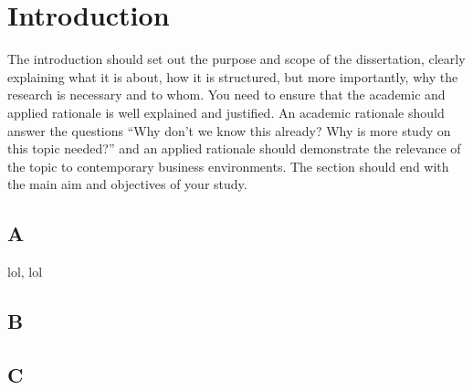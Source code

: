 \chapter{Introduction}\label{ch:introduction}

The introduction should set out the purpose and scope of the dissertation, clearly explaining what it is about, how it is structured, but more importantly, why the research is necessary and to whom. You need to ensure that the academic and applied rationale is well explained and justified. An academic rationale should answer the questions “Why don’t we know this already? Why is more study on this topic needed?” and an applied rationale should demonstrate the relevance of the topic to contemporary business environments. The section should end with the main aim and objectives of your study.


\section{A}\label{sec:A}
\ac{lol}, \ac{lol}
\lipsum[1-5]

\section{B}\label{sec:B}
\lipsum[1-5]

\section{C}\label{sec:C}
\lipsum[1-5]